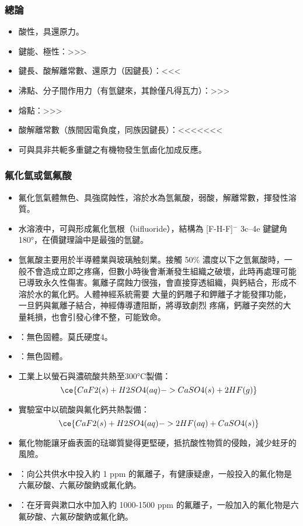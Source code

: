 \documentclass[a4paper,12pt]{report}
\begin{document}
\subsubsection{總論}
\begin{itemize}
\item 酸性，具還原力。
\item 鍵能、極性：>>>
\item 鍵長、酸解離常數、還原力（因鍵長）：<<<
\item 沸點、分子間作用力（有氫鍵來，其餘僅凡得瓦力）：>>>
\item 熔點：>>>
\item 酸解離常數（族間因電負度，同族因鍵長）：<<<<<<<
\item 可與具非共軛多重鍵之有機物發生氫鹵化加成反應。
\end{itemize}
\subsubsection{氟化氫或氫氟酸}
\begin{itemize}
\item 氟化氫氣體無色、具強腐蝕性，溶於水為氫氟酸，弱酸，解離常數，揮發性溶質。
\item 水溶液中，可與形成氟化氫根（bifluoride），結構為 [F-H-F]$^-$ 3c–4e 鍵鍵角180°，在價鍵理論中是最強的氫鍵。
\item 氫氟酸主要用於半導體業與玻璃触刻業。接觸 50\% 濃度以下之氫氟酸時，一般不會造成立即之疼痛，但數小時後會漸漸發生組織之破壞，此時再處理可能已導致永久性傷害。氟離子腐蝕力很強，會直接穿透組織，與鈣結合，形成不溶於水的氟化鈣。人體神經系統需要 大量的鈣雕子和鉀離子才能發揮功能，一旦鈣與氟離子結合，神經傳導遭阻斷，將導致劇烈 疼痛，鈣離子突然的大量耗損，也會引發心律不整，可能致命。
\item {}：無色固體。莫氏硬度4。
\item {}：無色固體。
\item 工業上以螢石與濃硫酸共熱至300°C製備：
\[\ce{CaF2(s) + H2SO4(aq) -> CaSO4(s) + 2HF(g)}\]
\item 實驗室中以硫酸與氟化鈣共熱製備：
\[\ce{CaF2(s) + H2SO4(aq) -> 2HF(aq) + CaSO4(s)}\]
\item 氟化物能讓牙齒表面的琺瑯質變得更堅硬，抵抗酸性物質的侵蝕，減少蛀牙的風險。
\item {}：向公共供水中投入約 1 ppm 的氟離子，有健康疑慮，一般投入的氟化物是六氟矽酸、六氟矽酸鈉或氟化鈉。
\item {}：在牙膏與漱口水中加入約 1000-1500 ppm 的氟離子，一般加入的氟化物是六氟矽酸、六氟矽酸鈉或氟化鈉。
\end{itemize}
\end{document}
